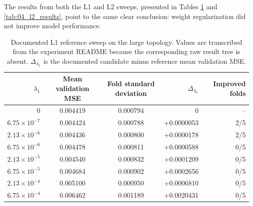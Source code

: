 The results from both the L1 and L2 sweeps, presented in Tables \ref{tab:04_l1_results} and \ref{tab:04_l2_results}, point to the same clear conclusion: weight regularization did not improve model performance.

\begin{table}[h!]
    \centering
    \begin{tabular}{rccrr}
        \hline
        $\lambda_1$ & Mean validation MSE & Fold standard deviation & $\Delta_{\lambda_1}$ & Improved folds \\
        \hline
        0 & 0.004419 & 0.000794 & 0 & -- \\
        $6.75\times10^{-7}$ & 0.004424 & 0.000788 & +0.0000053 & 2/5 \\
        $2.13\times10^{-6}$ & 0.004436 & 0.000800 & +0.0000178 & 2/5 \\
        $6.75\times10^{-6}$ & 0.004478 & 0.000811 & +0.0000588 & 0/5 \\
        $2.13\times10^{-5}$ & 0.004540 & 0.000832 & +0.0001209 & 0/5 \\
        $6.75\times10^{-5}$ & 0.004684 & 0.000902 & +0.0002656 & 0/5 \\
        $2.13\times10^{-4}$ & 0.005100 & 0.000950 & +0.0006810 & 0/5 \\
        $6.75\times10^{-4}$ & 0.006462 & 0.001189 & +0.0020431 & 0/5 \\
        \hline
    \end{tabular}
    \caption{Documented L1 reference sweep on the large topology. Values are transcribed from the experiment README because the corresponding raw result tree is absent. $\Delta_{\lambda_1}$ is the documented candidate minus reference mean validation MSE.}
    \label{tab:04_l1_results}
\end{table}

